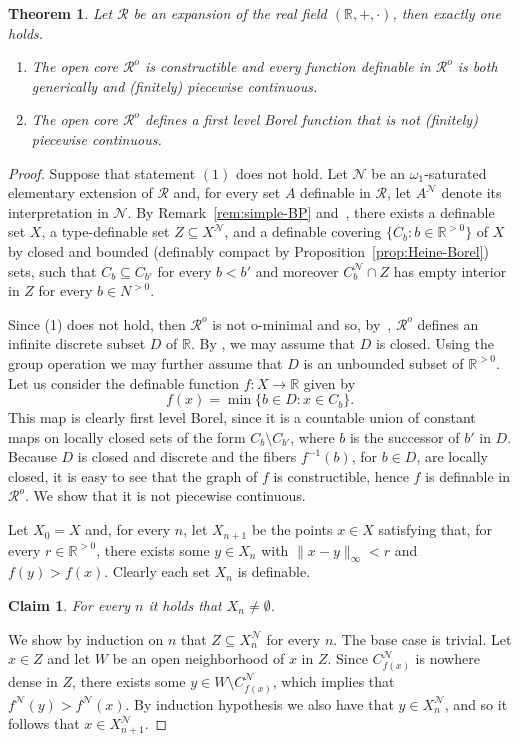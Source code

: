 \documentclass[12pt]{article}
\newcommand{\Nn}{\mathcal{N}}
\newcommand{\Rr}{\mathcal{R}}
\newcommand{\R}{\mathbb{R}}
\newcommand{\Ro}{\Rr^o}
\newtheorem{theorem}{Theorem}[section] %
\newtheorem{claim}{Claim}[theorem]
\theoremstyle{definition}
\theoremstyle{remark}
\newenvironment{claimproof}[1][\proofname]
               {
                 \proof[#1]
                 \renewcommand*\qedsymbol{$\square$\rlap{\textsubscript{Claim}}}
               }
               {
                 \endproof
               }
\begin{document}
\begin{theorem}\label{thm:Baire-class-one}
Let $\Rr$ be an expansion of the real field $(\R,+,\cdot)$, then exactly one holds. 
\begin{enumerate}
    \item The open core $\Ro$ is constructible and every function definable in $\Ro$ is both generically and (finitely) piecewise continuous. 
    \item The open core $\Ro$ defines a first level Borel function that is not (finitely) piecewise continuous.  
\end{enumerate}
\end{theorem}
\begin{proof}
Suppose that statement $(1)$ does not hold. Let $\Nn$ be an $\omega_1$-saturated elementary extension of $\Rr$ and, for every set $A$ definable in $\Rr$, let $A^{\Nn}$ denote its interpretation in $\Nn$. By Remark~\ref{rem:simple-BP} and~\cite[N.B. page 1378]{DMS10}, there exists a definable set $X$, a type-definable set $Z\subseteq X^{\Nn}$, and a definable covering $\{C_b : b\in \R^{>0}\}$ of $X$ by closed and bounded (definably compact by Proposition~\ref{prop:Heine-Borel}) sets, such that $C_b \subseteq C_{b'}$ for every $b<b'$ and moreover $C^{\Nn}_b \cap Z$ has empty interior in $Z$ for every $b\in N^{>0}$. 

Since (1) does not hold, then $\Ro$ is not o-minimal and so, by~\cite[Proposition 2.14]{DMS10}, $\Ro$ defines an infinite discrete subset $D$ of $\R$. By \cite[Theorem B]{hie-discrete}, we may assume that $D$ is closed. Using the group operation we may further assume that $D$ is an unbounded subset of $\R^{>0}$.
Let us consider the definable function $f:X\rightarrow \R$ given by 
\[
f(x)=\min\{ b\in D : x \in C_b\}.
\]
This map is clearly first level Borel, since it is a countable union of constant maps on locally closed sets of the form $C_{b}\setminus C_{b'}$, where $b$ is the successor of $b'$ in $D$. Because $D$ is closed and discrete and the fibers $f^{-1}(b)$, for $b\in D$, are locally closed, it is easy to see that the graph of $f$ is constructible, hence $f$ is definable in $\Ro$. We show that it is not piecewise continuous. 

Let $X_0=X$ and, for every $n$, let $X_{n+1}$ be the points $x\in X$ satisfying that, for every $r\in \R^{>0}$, there exists some $y\in X_n$ with $\|x-y\|_\infty<r$ and $f(y)>f(x)$. Clearly each set $X_n$ is definable. 

\begin{claim}\label{claim:Xn}
For every $n$ it holds that $X_n\neq \emptyset$. 
\end{claim}
\begin{claimproof}
We show by induction on $n$ that $Z\subseteq X_n^{\Nn}$ for every $n$. The base case is trivial. Let $x\in Z$ and let $W$ be an open neighborhood of $x$ in $Z$. Since $C_{f(x)}^{\Nn}$ is nowhere dense in $Z$, there exists some $y\in W \setminus C_{f(x)}^{\Nn}$, which implies that $f^{\Nn}(y)>f^{\Nn}(x)$. By induction hypothesis we also have that $y\in X_n^{\Nn}$, and so it follows that $x\in X_{n+1}^{\Nn}$.
\end{claimproof}


\end{proof}
\end{document}

